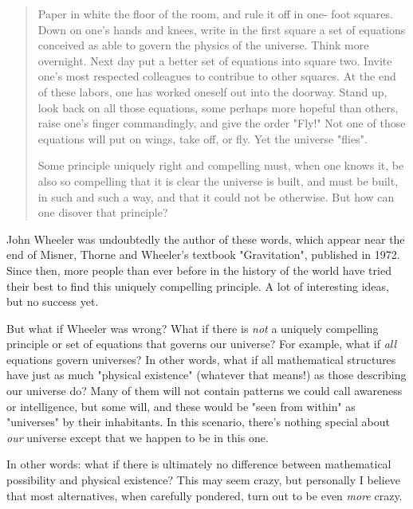 


\begin{quote}
     Paper in white the floor of the room, and rule it off in one-
     foot squares.  Down on one's hands and knees, write in the 
     first square a set of equations conceived as able to govern
     the physics of the universe.  Think more overnight.  Next day
     put a better set of equations into square two.  Invite one's most
     respected colleagues to contribue to other squares.  At the
     end of these labors, one has worked oneself out into the 
     doorway.  Stand up, look back on all those equations, some 
     perhaps more hopeful than others, raise one's finger commandingly,
     and give the order "Fly!"  Not one of those equations will put
     on wings, take off, or fly.  Yet the universe "flies".

     Some principle uniquely right and compelling must, when one 
     knows it, be also so compelling that it is clear the universe
     is built, and must be built, in such and such a way, and that
     it could not be otherwise.  But how can one disover that principle?

\end{quote}
John Wheeler was undoubtedly the author of these words, which appear
near the end of Misner, Thorne and Wheeler's textbook "Gravitation",
published in 1972.  Since then, more people than ever before in the
history of the world have tried their best to find this uniquely
compelling principle.  A lot of interesting ideas, but no success yet.

But what if Wheeler was wrong?  What if there is \emph{not} a uniquely
compelling principle or set of equations that governs our universe?  For
example, what if \emph{all} equations govern universes?  In other words, what
if all mathematical structures have just as much "physical
existence" (whatever that means!) as those describing our universe
do?  Many of them will not contain patterns we could call awareness or
intelligence, but some will, and these would be "seen from
within" as "universes" by their inhabitants.  In this
scenario, there's nothing special about \emph{our} universe except that we
happen to be in this one.

In other words: what if there is ultimately no difference between
mathematical possibility and physical existence?  This may seem crazy, but
personally I believe that most alternatives, when carefully pondered,
turn out to be even \emph{more} crazy.


